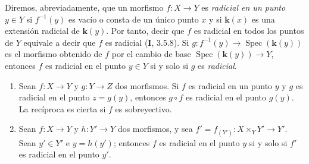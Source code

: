 \begin{env}[6.15.3]
\label{IV.2.s6.15.3-fr}
Diremos, abreviadamente, que un morfismo $f:X\to Y$ es
\emph{radicial en un punto} $y\in Y$ si $f^{-1}(y)$ es vacío
o consta de un único punto $x$ y si $\boldsymbol{k}(x)$ es una extensión
radicial de $\boldsymbol{k}(y)$. Por tanto, decir que $f$ es radicial en
todos los puntos de $Y$ equivale a decir que $f$ es radicial
(\textbf I, 3.5.8). Si $g:f^{-1}(y)\to\operatorname{Spec}(\boldsymbol{k}(y))$ es el
morfismo obtenido de $f$ por el cambio de base
$\operatorname{Spec}(\boldsymbol{k}(y))\to Y$, entonces $f$ es radicial en el
punto $y\in Y$ si y solo si $g$ es \emph{radicial}.
\end{env}

\begin{lemma}[6.15.3.1]
\label{IV.2.s6.15.3.1-fr}
\begin{enumerate}
\item[\textup{(i)}] Sean $f:X\to Y$ y $g:Y\to Z$ dos morfismos. Si $f$
es radicial en un punto $y$ y $g$ es radicial en el punto
$z=g(y)$, entonces $g\circ f$ es radicial en el punto $g(y)$.
La recíproca es cierta si $f$ es sobreyectivo.
\item[\textup{(ii)}] Sean $f:X\to Y$ y $h:Y'\to Y$ dos morfismos, y sea
$f'=f_{(Y')}:X\times_Y Y'\to Y'$. Sean $y'\in Y'$ e $y=h(y')$;
entonces $f$ es radicial en el punto $y$ si y solo si $f'$ es
radicial en el punto $y'$.
\end{enumerate}
\end{lemma}
